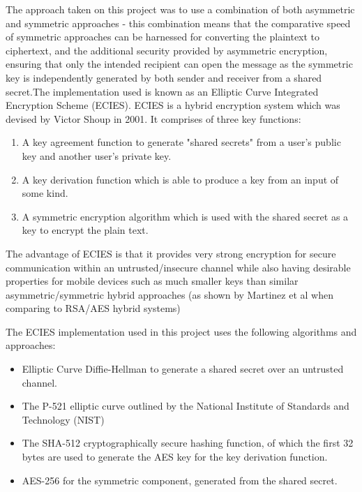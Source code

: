 \documentclass{mproj}
\begin{document}
The approach taken on this project was to use a combination of both asymmetric and symmetric approaches - this combination means that the comparative speed of symmetric approaches can be harnessed for converting the plaintext to ciphertext, and the additional security provided by asymmetric encryption, ensuring that only the intended recipient can open the message as the symmetric key is independently generated by both sender and receiver from a shared secret.The implementation used is known as an Elliptic Curve Integrated Encryption Scheme (ECIES)\cite{martinez2010comparison}. ECIES is a hybrid encryption system which was devised by Victor Shoup in 2001. It comprises of three key functions:
\begin{enumerate}
	\item A key agreement function to generate "shared secrets" from a user's public key and another user's private key.
	\item A key derivation function which is able to produce a key from an input of some kind.
	\item A symmetric encryption algorithm which is used with the shared secret as a key to encrypt the plain text.
\end{enumerate}
The advantage of ECIES is that it provides very strong encryption for secure communication within an untrusted/insecure channel while also having desirable properties for mobile devices such as much smaller keys than similar asymmetric/symmetric hybrid approaches (as shown by Martinez et al when comparing to RSA/AES hybrid systems\cite{martinezECIES})

The ECIES implementation used in this project uses the following algorithms and approaches:
\begin{itemize}
	\item Elliptic Curve Diffie-Hellman\cite{maurer2000diffie} to generate a shared secret over an untrusted channel. 
	\item The P-521 elliptic curve outlined by the National Institute of Standards and Technology (NIST)\cite{brown2001software}
	\item The SHA-512 cryptographically secure hashing function, of which the first 32 bytes are used to generate the AES key for the key derivation function.
	\item AES-256 for the symmetric component, generated from the shared secret.
\end{itemize}
\end{document}
